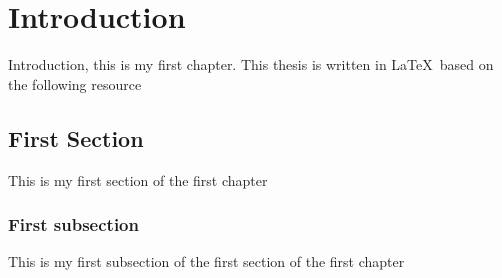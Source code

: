 \chapter{Introduction} 
\label{Chap1}

Introduction, this is my first chapter. This thesis is written in \LaTeX\ based on the following resource \citep{Lamport1985}

\blindtext[2]

\section{First Section}

This is my first section of the first chapter
\blindtext[2]

\subsection{First subsection}

This is my first subsection of the first section of the first chapter
\blindtext[2]